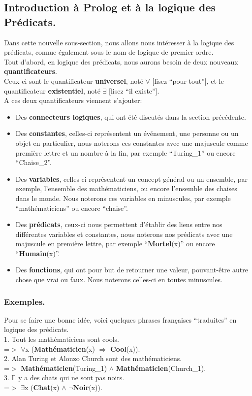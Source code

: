 \documentclass[a4paper, 12pt]{article}
\newcommand{\imply}{\Rightarrow}
\numberwithin{equation}{subsection}
\begin{document}
\subsection{Introduction à Prolog et à la logique des Prédicats.}
Dans cette nouvelle sous-section, nous allons nous intéresser à la logique des prédicats, connue également sous le nom de logique de premier ordre. \\
Tout d'abord, en logique des prédicats, nous aurons besoin de deux nouveaux {\bf quantificateurs}. \\
Ceux-ci sont le quantificateur {\bf universel}, noté $\forall$ [lisez ``pour tout''], et le quantificateur {\bf existentiel}, noté $\exists$ [lisez ``il existe'']. \\
A ces deux quantificateurs viennent s'ajouter:
\begin{itemize}
  \item Des {\bf connecteurs logiques}, qui ont été discutés dans la section précédente.
  \item Des {\bf constantes}, celles-ci représentent un événement, une personne ou un objet en particulier, nous noterons ces constantes avec une majuscule comme première lettre et un nombre à la fin, par exemple ``Turing\_1'' ou encore ``Chaise\_2''.
  \item Des {\bf variables}, celles-ci représentent un concept général ou un ensemble, par exemple, l'ensemble des mathématiciens, ou encore l'ensemble des chaises dans le monde. Nous noterons ces variables en minuscules, par exemple ``mathématiciens'' ou encore ``chaise''.
  \item Des {\bf prédicats}, ceux-ci nous permettent d'établir des liens entre nos différentes variables et constantes, nous noterons nos prédicats avec une majuscule en première lettre, par exemple ``{\bf Mortel}(x)'' ou encore ``{\bf Humain}(x)''.
  \item Des {\bf fonctions}, qui ont pour but de retourner une valeur, pouvant-être autre chose que vrai ou faux. Nous noterons celles-ci en toutes minuscules.
\end{itemize}
\subsubsection{Exemples.}
Pour se faire une bonne idée, voici quelques phrases françaises ``traduites'' en logique des prédicats. \\[0.5cm]
1. Tout les mathématiciens sont cools. \\
=$>$ $\forall$x ({\bf Mathématicien}(x) $\imply$ {\bf Cool}(x)). \\[0.2cm]
2. Alan Turing et Alonzo Church sont des mathématiciens. \\
=$>$ {\bf Mathématicien}(Turing\_1) $\land$ {\bf Mathématicien}(Church\_1). \\[0.2cm]
3. Il y a des chats qui ne sont pas noirs. \\
=$>$ $\exists$x ({\bf Chat}(x) $\land$ $\neg${\bf Noir}(x)). \\[0.2cm]
\end{document}
